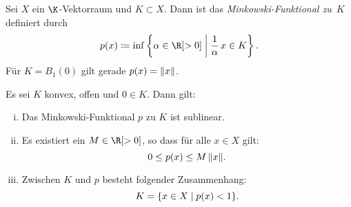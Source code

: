 \nnDef\label{vl06:minkowski} Sei $X$ ein $\K$-Vektorraum und $K\subset X$. Dann ist das
\emph{Minkowski-Funktional zu~$K$} definiert durch
\[ p(x) \defeq \inf\left\{ \alpha\in\R[>0] \Mid \frac{1}{\alpha}\,x \in K \right\}
. \]
Für $K=B_1(0)$ gilt gerade $p(x) = \lVert x\rVert$.

\pagebreak[2]
\begin{thLemma} \label{vl06:lemma4.12}
    Es sei $K$ konvex, offen und $0\in K$. Dann gilt:
    \begin{enumerate}[i)]
        \item \label{vl06:lemma4.12:i}
            Das Minkowski-Funktional $p$ zu $K$ ist sublinear.
            
        \item \label{vl06:lemma4.12:ii}
            Es existiert ein $M\in\R[>0]$, so dass für alle $x\in X$ gilt:
            \[ 0 \leq p(x) \leq M\,\lVert x\rVert  . \]
            
        \item \label{vl06:lemma4.12:iii}
            Zwischen $K$ und $p$ besteht folgender Zusammenhang:
            \[ K = \{ x\in X \Mid p(x) < 1 \}  . \]
    \end{enumerate}
\end{thLemma}

